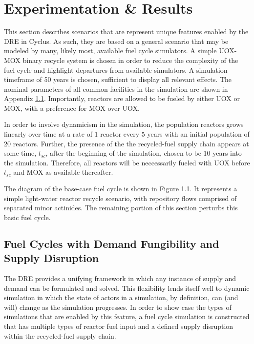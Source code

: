 \section{Experimentation \& Results}\label{results}

This section describes scenarios that are represent unique features enabled by
the DRE in Cyclus. As such, they are based on a general scenario that may be
modeled by many, likely most, available fuel cycle simulators. A simple UOX-MOX
binary recycle system is chosen in order to reduce the complexity of the fuel
cycle and highlight departures from available simulators. A simulation timeframe
of 50 years is chosen, sufficient to display all relevant effects. The nominal
parameters of all common facilities in the simulation are shown in Appendix
\ref{}. Importantly, reactors are allowed to be fueled by either UOX or MOX,
with a preference for MOX over UOX.

In order to involve dynamicism in the simulation, the population reactors grows
linearly over time at a rate of 1 reactor every 5 years with an initial
population of 20 reactors. Further, the presence of the the recycled-fuel supply
chain appears at some time, $t_{sc}$, after the beginning of the simulation,
chosen to be 10 years into the simulation. Therefore, all reactors will be
neccessarily fueled with UOX before $t_{sc}$ and MOX as available thereafter. 

The diagram of the base-case fuel cycle is shown in Figure \ref{}. It represents
a simple light-water reactor recycle scenario, with repository flows comprised
of separated minor actinides. The remaining portion of this section perturbs
this basic fuel cycle.

\subsection{Fuel Cycles with Demand Fungibility and Supply Disruption}

The DRE provides a unifying framework in which any instance of supply and demand
can be formulated and solved. This flexibility lends itself well to dynamic
simulation in which the state of actors in a simulation, by definition, can (and
will) change as the simulation progresses. In order to show case the types of
simulations that are enabled by this feature, a fuel cycle simulation is
constructed that has multiple types of reactor fuel input and a defined supply
disruption within the recycled-fuel supply chain.

